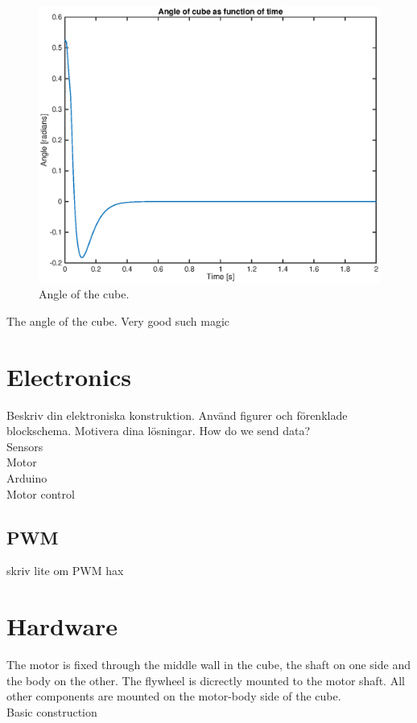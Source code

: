 \documentclass[a4paper,11pt]{kth-mag}
\begin{document}
\begin{figure}[!htb]
\centering
\includegraphics[scale=.7]{angleplot.eps}
\caption{Angle of the cube.}
\label{fig:voltageplot}
\end{figure}

The angle of the cube. Very good such magic


\section{Electronics}
Beskriv din elektroniska konstruktion. Använd figurer och förenklade blockschema. Motivera dina lösningar.
How do we send data?
\\ Sensors
\\ Motor
\\ Arduino
\\ Motor control

\subsection{PWM}
skriv lite om PWM hax

\section{Hardware}
The motor is fixed through the middle wall in the cube, the shaft on one side and the body on the other. The flywheel is dicrectly mounted to the motor shaft. All other components are mounted on the motor-body side of the cube.
\\ Basic construction
\end{document}
